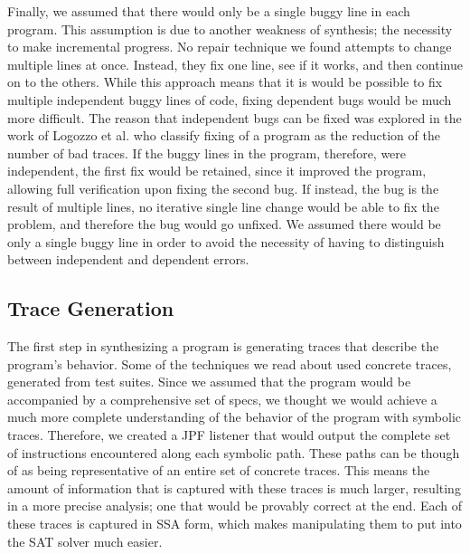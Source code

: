 \documentclass[]{article}
\begin{document}
Finally, we assumed that there would only be a single buggy line in each
program.  This assumption is due to another weakness of synthesis; the
necessity to make incremental progress.  No repair technique we found attempts to change
multiple lines at once.  Instead, they fix one line, see if it works, and
then continue on to the others.  While this approach means that it is would
be possible to fix multiple independent buggy lines of code, fixing
dependent bugs would be much more difficult.  The reason that independent
bugs can be fixed was explored in the work of Logozzo et al. \cite{logozzoInference} who classify
fixing of a program as the reduction of the number of bad traces.  If the
buggy lines in the program, therefore, were independent, the first fix would
be retained, since it improved the program, allowing full verification upon
fixing the second bug.  If instead, the bug is the result of multiple lines,
no iterative single line change would be able to fix the problem, and
therefore the bug would go unfixed.  We assumed there would be only a single
buggy line in order to avoid the necessity of having to distinguish between
independent and dependent errors.

\subsection{Trace Generation}
The first step in synthesizing a program is generating traces that describe
the program's behavior.  Some of the techniques we read about used concrete
traces, generated from test suites.  Since we assumed that the program would
be accompanied by a comprehensive set of specs, we thought we would achieve
a much more complete understanding of the behavior of the program with
symbolic traces.  Therefore, we created a JPF listener that would output the
complete set of instructions encountered along each symbolic path.  These
paths can be though of as being representative of an entire set of concrete
traces.  This means the amount of information that is captured with these
traces is much larger, resulting in a more precise analysis; one that would
be provably correct at the end.  Each of these traces is captured in SSA
form, which makes manipulating them to put into the SAT solver much easier.
\end{document}
